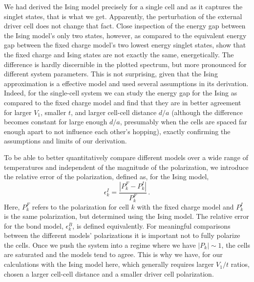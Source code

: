 We had derived the Ising model precisely for a single cell and as it captures
the singlet states, that is what we get. Apparently, the perturbation of the
external driver cell does not change that fact. Close inspection of the energy
gap between the Ising model's only two states, however, as compared to the
equivalent energy gap between the fixed charge model's two lowest energy singlet
states, show that the fixed charge and Ising states are not exactly the same,
energetically. The difference is hardly discernible in the plotted spectrum, but
more pronounced for different system parameters. This is not surprising, given
that the Ising approximation is a effective model and used several assumptions
in its derivation. Indeed, for the single-cell system we can study the energy
gap for the Ising as compared to the fixed charge model and find that they are
in better agreement for larger $V_1$, smaller $t$, and larger cell-cell distance
$d/a$ (although the difference becomes constant for large enough $d/a$,
presumably when the cells are spaced far enough apart to not influence each
other's hopping), exactly confirming the assumptions and limits of our
derivation.

To be able to better quantitatively compare different models over a wide range
of temperatures and independent of the magnitude of the polarization, we
introduce the relative error of the polarization, defined as, for the Ising
model,
%
\begin{equation}
  \epsilon^I_k = \frac{\left|P^F_k - P^I_k\right|}{P^F_k} \, .
\end{equation}
%
Here, $P^F_k$ refers to the polarization for cell $k$ with the fixed charge
model and $P^I_k$ is the same polarization, but determined using the Ising
model. The relative error for the bond model, $\epsilon^B_k$, is defined
equivalently. For meaningful comparisons between the different models'
polarizations it is important not to fully polarize the cells. Once we push the
system into a regime where we have $\left| P_k \right| \sim 1$, the cells are
saturated and the models tend to agree. This is why we have, for our
calculations with the Ising model here,
which generally requires larger $V_1/t$ ratios, chosen a larger cell-cell
distance and a smaller driver cell polarization.


